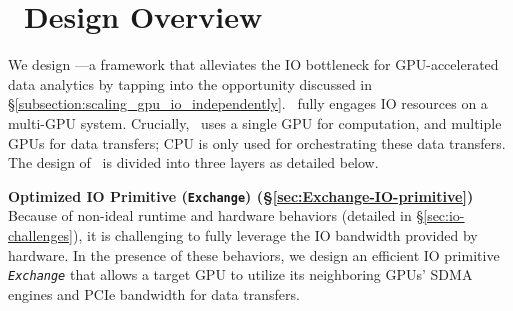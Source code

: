 \section{\THISWORK\ Design Overview} \label{section:design_overview}

We design \THISWORK---a framework that alleviates the IO bottleneck for GPU-accelerated data analytics by tapping into the opportunity discussed in \S\ref{subsection:scaling_gpu_io_independently}.
\THISWORK\ fully engages IO resources on a multi-GPU system. 
Crucially, \THISWORK\ uses a single GPU for computation, and multiple GPUs for data transfers; CPU is only used for orchestrating these data transfers.
The design of \THISWORK\ is divided into three layers as detailed below.

\begin{comment}
We build \THISWORK, a proof-of-concept software stack, to justify our IO redistribution idea.
\THISWORK\ redistributes IO resources on multi-GPU systems to break the IO bottleneck of a single GPU and provides examples to understand the applications' performance characteristics when using this new scheme.  
\textcolor{blue}{\THISWORK\ only use GPU to do the real computation, and CPU is only used for scheduling}
\THISWORK\ includes three layers, each serving a different design goal.
It has an optimized IO primitive at the bottom, an IO-decoupled programming model in the middle, and example implementations of 3 important applications on the top.
\end{comment}

\noindent
\textbf{Optimized IO Primitive (\texttt{Exchange}) (\S\ref{sec:Exchange-IO-primitive})}
Because of non-ideal runtime and hardware behaviors (detailed in \S\ref{sec:io-challenges}), it is challenging to fully leverage the IO bandwidth provided by hardware.
In the presence of these behaviors, we design an efficient IO primitive \textit{\texttt{Exchange}} that allows a target GPU to utilize its neighboring GPUs' SDMA engines and PCIe bandwidth for data transfers.

\begin{comment}
\textbf{Optimized IO-primitive, \texttt{Exchange} (\S~\ref{sec:Exchange-IO-primitive}). } 
It is non-trivial to carry out our novel IO redistribution idea using existing GPU runtime and hardware due to a bunch of nonidealities we will explain in \S~\ref{sec:io-challenges}.
\texttt{Exchange} allows a \textit{target GPU} to use its neighboring \textit{forwarding GPUs}' under-utilized SDMA engines and PCIe bandwidth to enhance its own IO throughput.  
With our special design, \texttt{Exchange} unleashes the full potential of the underlying hardware.
\end{comment}

